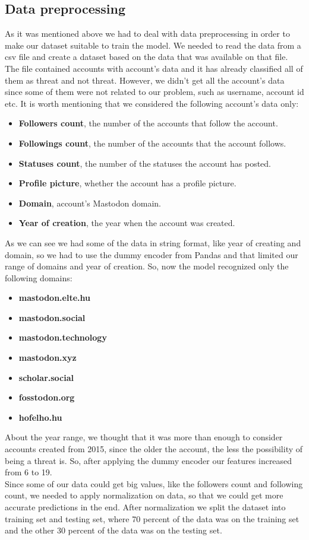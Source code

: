 \subsection{Data preprocessing}
As it was mentioned above we had to deal with data preprocessing in order to make our dataset suitable
to train the model. We needed to read the data from a csv file and create a dataset based on the data
that was available on that file. The file contained accounts with account's data and it has already classified all of them as threat
and not threat. However, we didn't get all the account's data since some of them were not related to our problem, such as username, account id etc.
It is worth mentioning that we considered the following account's data only:
\begin{itemize}
	\item \textbf{Followers count}, the number of the accounts that follow the account.
	\item \textbf{Followings count}, the number of the accounts that the account follows.
	\item \textbf{Statuses count}, the number of the statuses the account has posted.
	\item \textbf{Profile picture}, whether the account has a profile picture.
	\item \textbf{Domain}, account's Mastodon domain.
	\item \textbf{Year of creation}, the year when the account was created.
\end{itemize}
As we can see we had some of the data in string format, like year of creating and domain, so we
had to use the dummy encoder from Pandas and that limited our range of domains and year of creation.
So, now the model recognized only the following domains:
\begin{itemize}
	\item \textbf{mastodon.elte.hu}
	\item \textbf{mastodon.social}
	\item \textbf{mastodon.technology}
	\item \textbf{mastodon.xyz}
	\item \textbf{scholar.social}
	\item \textbf{fosstodon.org}
	\item \textbf{hofelho.hu}
\end{itemize}
About the year range, we thought that it was more than enough to consider accounts created from 2015, since
the older the account, the less the possibility of being a threat is.
So, after applying the dummy encoder our features increased from 6 to 19.
\\[5pt]
Since some of our data could get big values, like the followers count and following count, we needed
to apply normalization on data, so that we could get more accurate predictions in the end.
After normalization we split the dataset into training set and testing set, where 70 percent of the data was on the
training set and the other 30 percent of the data was on the testing set.
